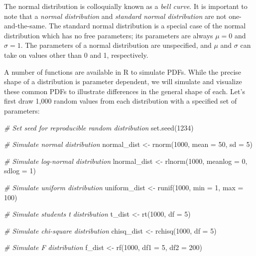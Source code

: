 \documentclass[
]{book}
\newenvironment{Shaded}{\begin{snugshade}}{\end{snugshade}}
\newcommand{\AttributeTok}[1]{\textcolor[rgb]{0.77,0.63,0.00}{#1}}
\newcommand{\CommentTok}[1]{\textcolor[rgb]{0.56,0.35,0.01}{\textit{#1}}}
\newcommand{\DecValTok}[1]{\textcolor[rgb]{0.00,0.00,0.81}{#1}}
\newcommand{\FunctionTok}[1]{\textcolor[rgb]{0.00,0.00,0.00}{#1}}
\newcommand{\NormalTok}[1]{#1}
\newcommand{\OtherTok}[1]{\textcolor[rgb]{0.56,0.35,0.01}{#1}}
\begin{document}
The normal distribution is colloquially known as a \emph{bell curve}. It is important to note that a \emph{normal distribution} and \emph{standard normal distribution} are not one-and-the-same. The standard normal distribution is a special case of the normal distribution which has no free parameters; its parameters are always \(\mu = 0\) and \(\sigma = 1\). The parameters of a normal distribution are unspecified, and \(\mu\) and \(\sigma\) can take on values other than 0 and 1, respectively.

A number of functions are available in R to simulate PDFs. While the precise shape of a distribution is parameter dependent, we will simulate and visualize these common PDFs to illustrate differences in the general shape of each. Let's first draw 1,000 random values from each distribution with a specified set of parameters:

\begin{Shaded}
\begin{Highlighting}[]
\CommentTok{\# Set seed for reproducible random distribution}
\FunctionTok{set.seed}\NormalTok{(}\DecValTok{1234}\NormalTok{)}

\CommentTok{\# Simulate normal distribution}
\NormalTok{normal\_dist }\OtherTok{\textless{}{-}} \FunctionTok{rnorm}\NormalTok{(}\DecValTok{1000}\NormalTok{, }\AttributeTok{mean =} \DecValTok{50}\NormalTok{, }\AttributeTok{sd =} \DecValTok{5}\NormalTok{)}

\CommentTok{\# Simulate log{-}normal distribution}
\NormalTok{lnormal\_dist }\OtherTok{\textless{}{-}} \FunctionTok{rlnorm}\NormalTok{(}\DecValTok{1000}\NormalTok{, }\AttributeTok{meanlog =} \DecValTok{0}\NormalTok{, }\AttributeTok{sdlog =} \DecValTok{1}\NormalTok{)}

\CommentTok{\# Simulate uniform distribution}
\NormalTok{uniform\_dist }\OtherTok{\textless{}{-}} \FunctionTok{runif}\NormalTok{(}\DecValTok{1000}\NormalTok{, }\AttributeTok{min =} \DecValTok{1}\NormalTok{, }\AttributeTok{max =} \DecValTok{100}\NormalTok{) }

\CommentTok{\# Simulate student\textquotesingle{}s t distribution}
\NormalTok{t\_dist }\OtherTok{\textless{}{-}} \FunctionTok{rt}\NormalTok{(}\DecValTok{1000}\NormalTok{, }\AttributeTok{df =} \DecValTok{5}\NormalTok{)}

\CommentTok{\# Simulate chi{-}square distribution}
\NormalTok{chisq\_dist }\OtherTok{\textless{}{-}} \FunctionTok{rchisq}\NormalTok{(}\DecValTok{1000}\NormalTok{, }\AttributeTok{df =} \DecValTok{5}\NormalTok{)}

\CommentTok{\# Simulate F distribution}
\NormalTok{f\_dist }\OtherTok{\textless{}{-}} \FunctionTok{rf}\NormalTok{(}\DecValTok{1000}\NormalTok{, }\AttributeTok{df1 =} \DecValTok{5}\NormalTok{, }\AttributeTok{df2 =} \DecValTok{200}\NormalTok{)}
\end{Highlighting}
\end{Shaded}
\end{document}
